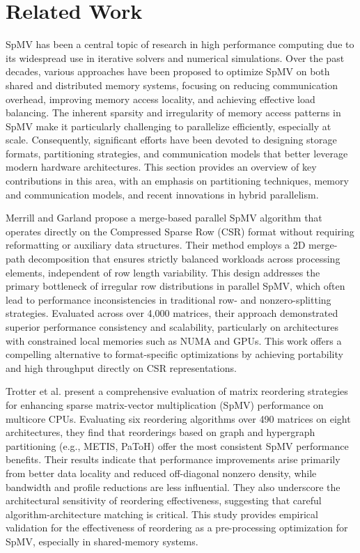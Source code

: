 \chapter{Related Work}
SpMV has been a central topic of research in high performance computing due to its widespread use in iterative solvers and numerical simulations. Over the past decades, various approaches have been proposed to optimize SpMV on both shared and distributed memory systems, focusing on reducing communication overhead, improving memory access locality, and achieving effective load balancing. The inherent sparsity and irregularity of memory access patterns in SpMV make it particularly challenging to parallelize efficiently, especially at scale. Consequently, significant efforts have been devoted to designing storage formats, partitioning strategies, and communication models that better leverage modern hardware architectures. This section provides an overview of key contributions in this area, with an emphasis on partitioning techniques, memory and communication models, and recent innovations in hybrid parallelism.
\medskip

Merrill and Garland \cite{merrilduane} propose a merge-based parallel SpMV algorithm that operates directly on the Compressed Sparse Row (CSR) format without requiring reformatting or auxiliary data structures. Their method employs a 2D merge-path decomposition that ensures strictly balanced workloads across processing elements, independent of row length variability. This design addresses the primary bottleneck of irregular row distributions in parallel SpMV, which often lead to performance inconsistencies in traditional row- and nonzero-splitting strategies. Evaluated across over 4,000 matrices, their approach demonstrated superior performance consistency and scalability, particularly on architectures with constrained local memories such as NUMA and GPUs. This work offers a compelling alternative to format-specific optimizations by achieving portability and high throughput directly on CSR representations.
\medskip

Trotter et al. \cite{ordersparse} present a comprehensive evaluation of matrix reordering strategies for enhancing sparse matrix-vector multiplication (SpMV) performance on multicore CPUs. Evaluating six reordering algorithms over 490 matrices on eight architectures, they find that reorderings based on graph and hypergraph partitioning (e.g., METIS, PaToH) offer the most consistent SpMV performance benefits. Their results indicate that performance improvements arise primarily from better data locality and reduced off-diagonal nonzero density, while bandwidth and profile reductions are less influential. They also underscore the architectural sensitivity of reordering effectiveness, suggesting that careful algorithm-architecture matching is critical. This study provides empirical validation for the effectiveness of reordering as a pre-processing optimization for SpMV, especially in shared-memory systems.





